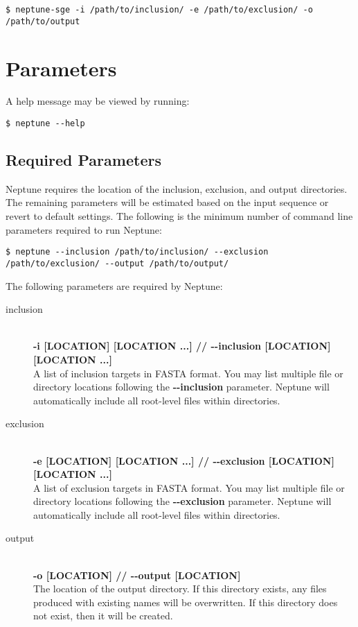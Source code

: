 \documentclass[a4paper,10pt]{article}
\begin{document}
\begin{lstlisting}[title={SGE Example}]
$ neptune-sge -i /path/to/inclusion/ -e /path/to/exclusion/ -o /path/to/output
\end{lstlisting}

\newpage
\section{Parameters}

A help message may be viewed by running:

\begin{lstlisting}
$ neptune --help
\end{lstlisting}

\subsection{Required Parameters}

Neptune requires the location of the inclusion, exclusion, and output directories. The remaining parameters will be estimated based on the input sequence or revert to default settings. The following is the minimum number of command line parameters required to run Neptune:

\begin{lstlisting}
$ neptune --inclusion /path/to/inclusion/ --exclusion /path/to/exclusion/ --output /path/to/output/
\end{lstlisting}

The following parameters are required by Neptune:

\begin{description}

  \item[inclusion] \hfill \\
  \textbf{-i [LOCATION] [LOCATION ...] // -{}-inclusion [LOCATION] [LOCATION ...]} \hfill \\
  A list of inclusion targets in FASTA format. You may list multiple file or directory locations following the \textbf{-{}-inclusion} parameter. Neptune will automatically include all root-level files within directories.  
  
  \item[exclusion] \hfill \\
  \textbf{-e [LOCATION] [LOCATION ...] // -{}-exclusion [LOCATION] [LOCATION ...]} \hfill \\
  A list of exclusion targets in FASTA format. You may list multiple file or directory locations following the \textbf{-{}-exclusion} parameter. Neptune will automatically include all root-level files within directories.
  
  \item[output] \hfill \\
  \textbf{-o [LOCATION] // -{}-output [LOCATION]} \hfill \\
  The location of the output directory. If this directory exists, any files produced with existing names will be overwritten. If this directory does not exist, then it will be created.
  
\end{description}
\end{document}
